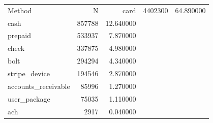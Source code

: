 \begin{tabular}{lrr}
\toprule
Method & N & %
\midrule
card & 4402300 & 64.890000 \\
cash & 857788 & 12.640000 \\
prepaid & 533937 & 7.870000 \\
check & 337875 & 4.980000 \\
bolt & 294294 & 4.340000 \\
stripe_device & 194546 & 2.870000 \\
accounts_receivable & 85996 & 1.270000 \\
user_package & 75035 & 1.110000 \\
ach & 2917 & 0.040000 \\
\bottomrule
\end{tabular}
